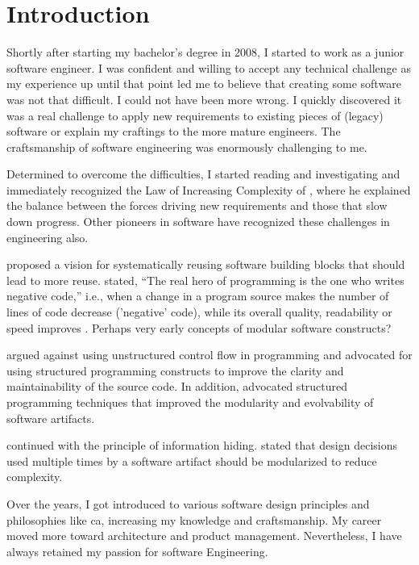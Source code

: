 \chapter{Introduction} \label{chap_introduction}

Shortly after starting my bachelor's degree in 2008, I started to work as a junior
software engineer. I was confident and willing to accept any technical challenge as my
experience up until that point led me to believe that creating some software was not that
difficult. I could not have been more wrong. I quickly discovered it was a real challenge
to apply new requirements to existing pieces of (legacy) software or explain my craftings
to the more mature engineers. The craftsmanship of software engineering was enormously
challenging to me.

Determined to overcome the difficulties, I started reading and investigating and
immediately recognized the Law of Increasing Complexity of
\textcite{lehman_programs_1980}, where he explained the balance between the forces driving
new requirements and those that slow down progress. Other pioneers in software have
recognized these challenges in engineering also.


\textcite{d_mcilroy_nato_1968} proposed a vision for systematically reusing software building
blocks that should lead to more reuse. \textcite{d_mcilroy_nato_1968} stated, \enquote{The real
hero of programming is the one who writes negative code,} i.e., when a change in a program
source makes the number of lines of code decrease ('negative' code), while its overall
quality, readability or speed improves \parencite{wikipedia_douglas_2023}. Perhaps very
early concepts of modular software constructs?

\textcite{dijkstra_letters_1968} argued against using unstructured control flow in
programming and advocated for using structured programming constructs to improve the
clarity and maintainability of the source code. In addition,
 advocated structured programming techniques that
improved the modularity and evolvability of software artifacts.

\textcite{parnas_criteria_1972} continued with the principle of information hiding.
 stated that design decisions used multiple times by a
software artifact should be modularized to reduce complexity. 

Over the years, I got introduced to various software design principles and philosophies
like \gls{ca}, increasing my knowledge and craftsmanship. My career moved more toward
architecture and product management. Nevertheless, I have always retained my passion for
software Engineering.

